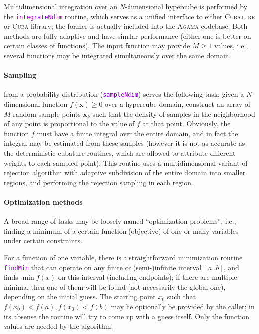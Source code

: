 \documentclass[12pt]{article}
\newcommand{\Agama}{\textsc{Agama}\xspace}
\newcommand{\ttt}[1]{\textcolor{darkviolet}{\texttt{#1}}}
\newcommand{\bx}{\boldsymbol{x}}
\begin{document}
Multidimensional integration over an $N$-dimensional hypercube is performed by the \ttt{integrateNdim} routine, which serves as a unified interface to either \textsc{Cubature} or \textsc{Cuba} library; the former is actually included into the \Agama codebase. Both methods are fully adaptive and have similar performance (either one is better on certain classes of functions). The input function may provide $M\ge 1$ values, i.e., several functions may be integrated simultaneously over the same domain.

\paragraph{Sampling} \label{sec:Sampling}  from a probability distribution (\ttt{sampleNdim}) serves the following task: given a $N$-dimensional function $f(\bx)\ge 0$ over a hypercube domain, construct an array of $M$ random sample points $\bx_k$ such that the density of samples in the neighborhood of any point is proportional to the value of $f$ at that point. Obviously, the function $f$ must have a finite integral over the entire domain, and in fact the integral may be estimated from these samples (however it is not as accurate as the deterministic cubature routines, which are allowed to attribute different weights to each sampled point). This routine uses a multidimensional variant of rejection algorithm with adaptive subdivision of the entire domain into smaller regions, and performing the rejection sampling in each region.

\paragraph{Optimization methods}
A broad range of tasks may be loosely named ``optimization problems'', i.e., finding a minimum of a certain function (objective) of one or many variables under certain constraints.

For a function of one variable, there is a straightforward minimization routine \ttt{findMin} that can operate on any finite or (semi-)infinite interval $[a..b]$, and finds $\min f(x)$ on this interval (including endpoints); if there are multiple minima, then one of them will be found (not necessarily the global one), depending on the initial guess. The starting point $x_0$ such that  $f(x_0)<f(a), f(x_0)<f(b)$ may be optionally be provided by the caller; in its absense the routine will try to come up with a guess itself. Only the function values are needed by the algorithm.
\end{document}
